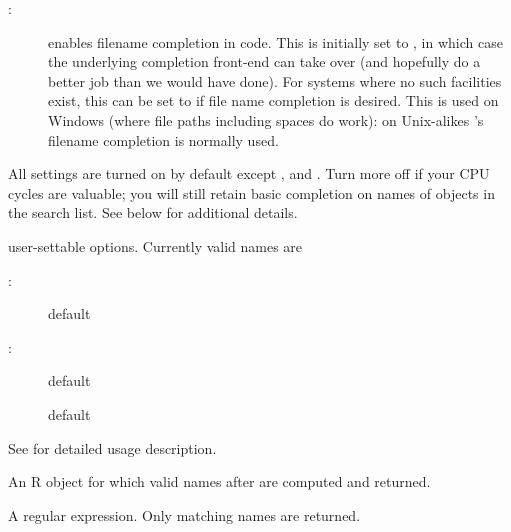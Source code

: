 \begin{Arguments}
\begin{ldescription}
\begin{description}
\item[:]  enables filename completion in \R{} code.  This
is initially set to , in which case the underlying
completion front-end can take over (and hopefully do a better
job than we would have done).  For systems where no such
facilities exist, this can be set to  if file name
completion is desired.  This is used on Windows (where file
paths including spaces do work): on Unix-alikes
's filename completion is normally used.



\end{description}


All settings are turned on by default except ,
 and .  Turn more off if your CPU cycles are
valuable; you will still retain basic completion on names of objects
in the search list.  See below for additional details.

\item[\code{name, ...}]  user-settable options.  Currently valid names are
\begin{description}

\item[:]  default  
\item[:]  default  
\item[]  default  

\end{description}

See  for detailed usage description.


\item[\code{x}]  An R object for which valid names after 
are computed and returned.


\item[\code{pattern}]  A regular expression.  Only matching names are
returned.

\end{ldescription}
\end{Arguments}
%
